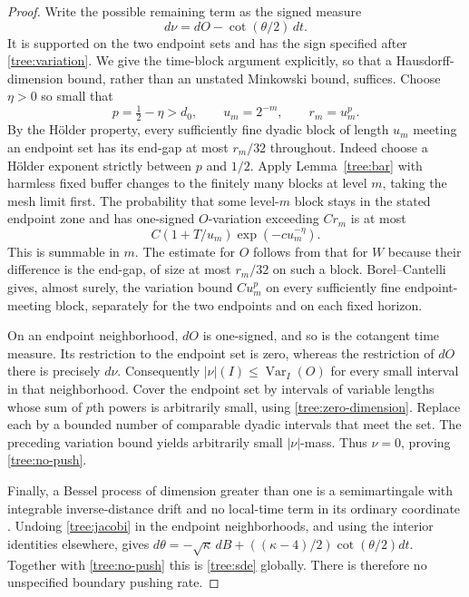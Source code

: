 \begin{proof}
Write the possible remaining term as the signed measure
\[
 d\nu=dO-\cot(\theta/2)\,dt.
\]
It is supported on the two endpoint sets and has the sign specified
after \eqref{tree:variation}.  We give the time-block argument
explicitly, so that a Hausdorff-dimension bound, rather than an unstated
Minkowski bound, suffices.  Choose $\eta>0$ so small that
\[
 p=\tfrac12-\eta>d_0,
 \qquad u_m=2^{-m},\qquad r_m=u_m^p.
\]
By the H\"older property, every sufficiently fine dyadic block of
length $u_m$ meeting an endpoint set has its end-gap at most $r_m/32$
throughout.  Indeed choose a H\"older exponent strictly between $p$
and $1/2$.  Apply Lemma~\ref{tree:bar} with harmless fixed buffer
changes to the finitely many blocks at level $m$, taking the mesh
limit first.  The probability that some level-$m$ block stays in the
stated endpoint zone and has one-signed $O$-variation exceeding $Cr_m$
is at most
\begin{equation}\label{tree:block-sum}
 C(1+T/u_m)\exp(-c u_m^{-\eta}).
\end{equation}
This is summable in $m$.  The estimate for $O$ follows from that for
$W$ because their difference is the end-gap, of size at most $r_m/32$
on such a block.  Borel--Cantelli gives, almost surely, the variation
bound $Cu_m^p$ on every sufficiently fine endpoint-meeting block,
separately for the two endpoints and on each fixed horizon.

On an endpoint neighborhood, $dO$ is one-signed, and so is the
cotangent time measure.  Its restriction to the endpoint set is zero,
whereas the restriction of $dO$ there is precisely $d\nu$.
Consequently $|\nu|(I)\le\operatorname{Var}_I(O)$ for every small
interval in that neighborhood.  Cover the endpoint set by intervals
of variable lengths whose sum of $p$th powers is arbitrarily small,
using \eqref{tree:zero-dimension}.  Replace each by a bounded number
of comparable dyadic intervals that meet the set.  The preceding
variation bound yields arbitrarily small $|\nu|$-mass.  Thus
$\nu=0$, proving \eqref{tree:no-push}.

Finally, a Bessel process of dimension greater than one is a
semimartingale with integrable inverse-distance drift and no local-time
term in its ordinary coordinate
\citep[Lemma~3.2]{HutzenthalerJentzenNoll2014}.  Undoing \eqref{tree:jacobi} in the
endpoint neighborhoods, and using the interior identities elsewhere,
gives
$d\theta=-\sqrt\kappa\,dB+((\kappa-4)/2)\cot(\theta/2)dt$.
Together with \eqref{tree:no-push} this is \eqref{tree:sde} globally.
There is therefore no unspecified boundary pushing rate.
\end{proof}

